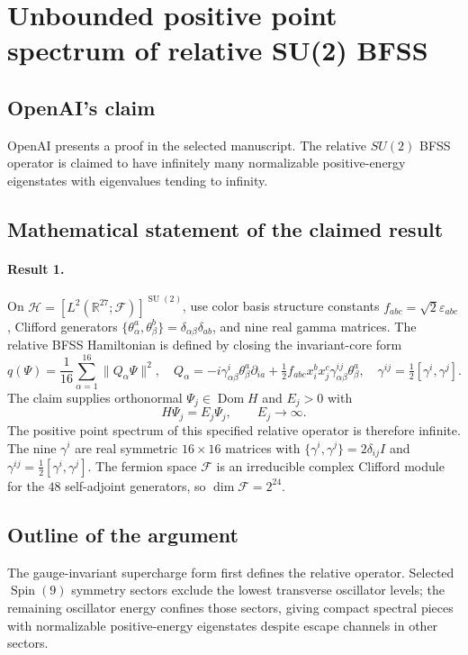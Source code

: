 \documentclass[11pt]{article}
\begin{document}
\section*{Unbounded positive point spectrum of relative SU(2) BFSS}

\subsection{OpenAI's claim}
OpenAI presents a proof in the selected manuscript. The relative $SU(2)$ BFSS operator is claimed to have infinitely many normalizable positive-energy eigenstates with eigenvalues tending to infinity.

\subsection{Mathematical statement of the claimed result}
\paragraph{Result 1.} On \(\mathcal H=[L^2(\mathbb R^{27};\mathcal F)]^{\operatorname{SU}(2)}\), use color basis structure constants \(f_{abc}=\sqrt2\varepsilon_{abc}\), Clifford generators \(\{\theta_\alpha^a,\theta_\beta^b\}=\delta_{\alpha\beta}\delta_{ab}\), and nine real gamma matrices. The relative BFSS Hamiltonian is defined by closing the invariant-core form
\[
 q(\Psi)=\frac1{16}\sum_{\alpha=1}^{16}\|Q_\alpha\Psi\|^2,\quad
 Q_\alpha=-i\gamma^i_{\alpha\beta}\theta_\beta^a\partial_{ia}
 +\tfrac12 f_{abc}x_i^bx_j^c\gamma^{ij}_{\alpha\beta}\theta_\beta^a,
 \quad\gamma^{ij}=\tfrac12[\gamma^i,\gamma^j].
\]
The claim supplies orthonormal \(\Psi_j\in\operatorname{Dom}H\) and \(E_j>0\) with
\[
 H\Psi_j=E_j\Psi_j,\qquad E_j\to\infty.
\]
The positive point spectrum of this specified relative operator is therefore infinite. The nine $\gamma^i$ are real symmetric $16\times16$ matrices with $\{\gamma^i,\gamma^j\}=2\delta_{ij}I$ and $\gamma^{ij}=\tfrac12[\gamma^i,\gamma^j]$. The fermion space $\mathcal F$ is an irreducible complex Clifford module for the $48$ self-adjoint generators, so $\dim\mathcal F=2^{24}$.

\subsection{Outline of the argument}
The gauge-invariant supercharge form first defines the relative operator. Selected $\operatorname{Spin}(9)$ symmetry sectors exclude the lowest transverse oscillator levels; the remaining oscillator energy confines those sectors, giving compact spectral pieces with normalizable positive-energy eigenstates despite escape channels in other sectors.
\end{document}
